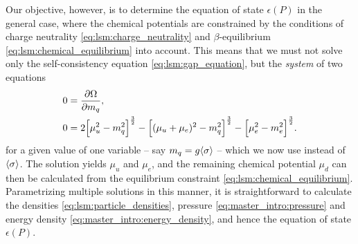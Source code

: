 Our objective, however, is to determine the equation of state $\epsilon(P)$ in the general case,
where the chemical potentials are constrained by the conditions of charge neutrality \eqref{eq:lsm:charge_neutrality} and $\beta$-equilibrium \eqref{eq:lsm:chemical_equilibrium} into account.
This means that we must not solve only the self-consistency equation \eqref{eq:lsm:gap_equation},
but the \emph{system} of two equations
\begin{subequations}
\begin{align}
	0 &= \pdv{\Omega}{m_q} , \label{eq:lsm:minsys_min} \\
	0 &= 2 \Big[\mu_u^2-m_q^2\Big]^\frac32 - \Big[(\mu_u+\mu_e)^2-m_q^2\Big]^\frac32 - \Big[\mu_e^2-m_e^2\Big]^\frac32 \label{eq:lsm:minsys_charge}.
\end{align}%
\label{eq:lsm:minsys}%
\end{subequations}%
for a given value of one variable -- say $m_q=g \langle \sigma \rangle$ -- which we now use instead of $\langle \sigma \rangle$.
The solution yields $\mu_u$ and $\mu_e$, and the remaining chemical potential $\mu_d$ can then be calculated from the equilibrium constraint \eqref{eq:lsm:chemical_equilibrium}.
Parametrizing multiple solutions in this manner, it is straightforward to calculate the densities \eqref{eq:lsm:particle_densities}, pressure \eqref{eq:master_intro:pressure} and energy density \eqref{eq:master_intro:energy_density},
and hence the equation of state $\epsilon(P)$.


